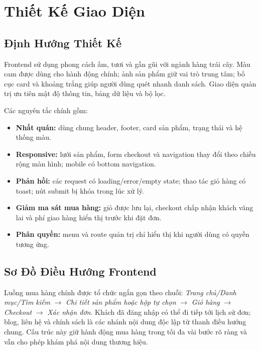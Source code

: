 \chapter{Thiết Kế Giao Diện}

\section{Định Hướng Thiết Kế}

Frontend sử dụng phong cách ấm, tươi và gần gũi với ngành hàng trái cây. Màu cam được dùng cho hành động chính; ảnh sản phẩm giữ vai trò trung tâm; bố cục card và khoảng trắng giúp người dùng quét nhanh danh sách. Giao diện quản trị ưu tiên mật độ thông tin, bảng dữ liệu và bộ lọc.

Các nguyên tắc chính gồm:

\begin{itemize}[leftmargin=2em, itemsep=4pt]
  \item \textbf{Nhất quán:} dùng chung header, footer, card sản phẩm, trạng thái và hệ thống màu.
  \item \textbf{Responsive:} lưới sản phẩm, form checkout và navigation thay đổi theo chiều rộng màn hình; mobile có bottom navigation.
  \item \textbf{Phản hồi:} các request có loading/error/empty state; thao tác giỏ hàng có toast; nút submit bị khóa trong lúc xử lý.
  \item \textbf{Giảm ma sát mua hàng:} giỏ được lưu lại, checkout chấp nhận khách vãng lai và phí giao hàng hiển thị trước khi đặt đơn.
  \item \textbf{Phân quyền:} menu và route quản trị chỉ hiển thị khi người dùng có quyền tương ứng.
\end{itemize}

\section{Sơ Đồ Điều Hướng Frontend}

Luồng mua hàng chính được tổ chức ngắn gọn theo chuỗi: \textit{Trang chủ/Danh mục/Tìm kiếm} $\rightarrow$ \textit{Chi tiết sản phẩm hoặc hộp tự chọn} $\rightarrow$ \textit{Giỏ hàng} $\rightarrow$ \textit{Checkout} $\rightarrow$ \textit{Xác nhận đơn}. Khách đã đăng nhập có thể đi tiếp tới lịch sử đơn; blog, liên hệ và chính sách là các nhánh nội dung độc lập từ thanh điều hướng chung. Cấu trúc này giữ hành động mua hàng trong tối đa vài bước rõ ràng và vẫn cho phép khám phá nội dung thương hiệu.

